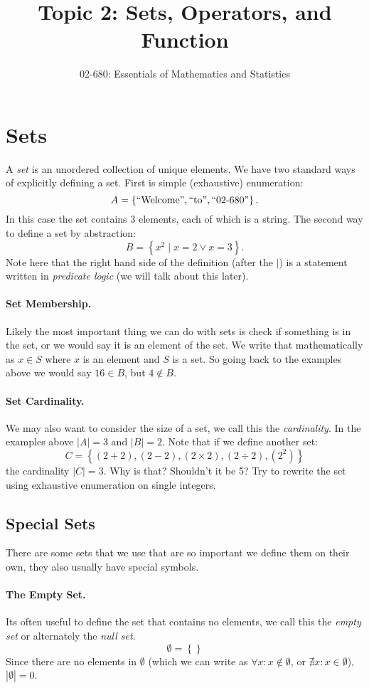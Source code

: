 \documentclass[11pt, oneside]{article}   	%
\title{Topic 2: Sets, Operators, and Function}
\author{02-680: Essentials of Mathematics and Statistics}
\begin{document}
\maketitle

\section{Sets}
A \emph{set} is an unordered collection of unique elements. 
We have two standard ways of explicitly defining a set. 
First is simple (exhaustive) enumeration:
\[
A = \left\{\textnormal{``Welcome''}, \textnormal{``to''}, \textnormal{``02-680''}\right\}.
\]
In this case the set contains 3 elements, each of which is a string.
The second way to define a set by abstraction:
\[
B = \left\{x^2 \mid x=2 \vee x=3 \right\}.
\]
Note here that the right hand side of the definition (after the $\mid$) is a statement written in \emph{predicate logic} (we will talk about this later).

\paragraph{Set Membership.} Likely the most important thing we can do with sets is check if something is in the set, 
or we would say it is an element of the set. 
We write that mathematically as $x \in S$ where $x$ is an element and $S$ is a set. 
So going back to the examples above we would say $16 \in B$, but $4 \notin B$.

\paragraph{Set Cardinality.} 
We may also want to consider the size of a set, we call this the \emph{cardinality}.
In the examples above $|A|=3$ and $|B| = 2$.
Note that if we define another set:
\[
C = \left\{ \left(2+2\right), \left(2-2\right), \left(2\times2\right), \left(2\div2\right), \left(2^2\right) \right\}
\]
the cardinality $|C|=3$. 
Why is that? Shouldn't it be 5? 
Try to rewrite the set using exhaustive enumeration on single integers.

\subsection{Special Sets}
There are some sets that we use that are so important we define them on their own, they also usually have special symbols. 

\paragraph{The Empty Set.} 
Its often useful to define the set that contains no elements, we call this the \emph{empty set} or alternately the \emph{null set}. 
\[
\emptyset = \left\{\right\}
\]
Since there are no elements in $\emptyset$ (which we can write as $\forall x: x \notin \emptyset$, or $\nexists x: x \in \emptyset$), $|\emptyset| = 0$. 
\end{document}
